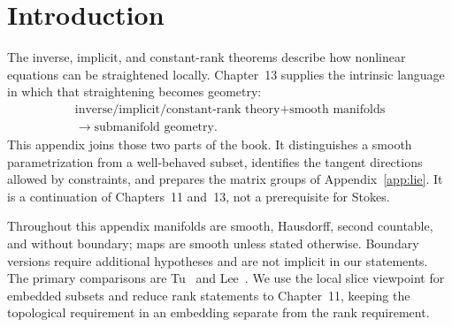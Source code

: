 \label{app:submanifolds}
\section*{Introduction}
The inverse, implicit, and constant-rank theorems describe how nonlinear
equations can be straightened locally. Chapter~13 supplies the intrinsic
language in which that straightening becomes geometry:
\[
\begin{gathered}
\text{inverse/implicit/constant-rank theory}+\text{smooth manifolds}\\
\longrightarrow\text{submanifold geometry}.
\end{gathered}
\]
This appendix joins those two parts of the book. It distinguishes a smooth
parametrization from a well-behaved subset, identifies the tangent directions
allowed by constraints, and prepares the matrix groups of
Appendix~\ref{app:lie}. It is a continuation of Chapters~11 and~13, not a
prerequisite for Stokes.

Throughout this appendix manifolds are smooth, Hausdorff, second countable,
and without boundary; maps are smooth unless stated otherwise. Boundary
versions require additional hypotheses and are not implicit in our statements.
The primary comparisons are Tu~\cite[\S\S9,11]{tu-manifolds} and
Lee~\cite[Chapters 4--6]{lee-smooth}. We use the local slice viewpoint for
embedded subsets and reduce rank statements to Chapter~11, keeping the
topological requirement in an embedding separate from the rank requirement.

